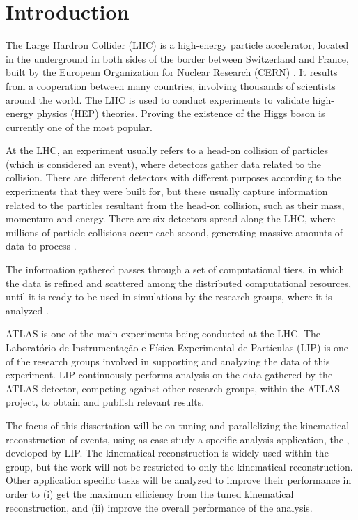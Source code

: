 
\chapter{Introduction}

The Large Hardron Collider (LHC) \cite{CERN:LHC} is a high-energy particle accelerator, located in the underground in both sides of the border between Switzerland and France, built by the European Organization for Nuclear Research (CERN) \cite{CERN}. It results from a cooperation between many countries, involving thousands of scientists around the world. The LHC is used to conduct experiments to validate high-energy physics (HEP) theories. Proving the existence of the Higgs boson is currently one of the most popular.

At the LHC, an experiment usually refers to a head-on collision of particles (which is considered an event), where detectors gather data related to the collision. There are different detectors with different purposes according to the experiments that they were built for, but these usually capture information related to the particles resultant from the head-on collision, such as their mass, momentum and energy. There are six detectors spread along the LHC, where millions of particle collisions occur each second, generating massive amounts of data to process \cite{LIP:Ibergrid}.

The information gathered passes through a set of computational tiers, in which the data is refined and scattered among the distributed computational resources, until it is ready to be used in simulations by the research groups, where it is analyzed \cite{CERN:DATA}.

ATLAS \cite{CERN:ATLAS} is one of the main experiments being conducted at the LHC. The Laboratório de Instrumentação e Física Experimental de Partículas (LIP) \cite{LIP} is one of the research groups involved in supporting and analyzing the data of this experiment. LIP continuously performs analysis on the data gathered by the ATLAS detector, competing against other research groups, within the ATLAS project, to obtain and publish relevant results.

The focus of this dissertation will be on tuning and parallelizing the kinematical reconstruction of events, using as case study a specific analysis application, the \tth, developed by LIP. The kinematical reconstruction is widely used within the group, but the work will not be restricted to only the kinematical reconstruction. Other application specific tasks will be analyzed to improve their performance in order to (i) get the maximum efficiency from the tuned kinematical reconstruction, and (ii) improve the overall performance of the analysis.

